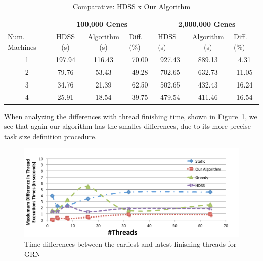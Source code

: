 \documentclass[journal]{IEEEtran}
\begin{document}
\begin{table}[htb]
\centering
\caption{Comparative: HDSS x Our Algorithm}

\begin{tabular}{c|c|c|c|c|c|c|}
\cline{2-7}
\multicolumn{1}{l|}{}                 & \multicolumn{3}{c|}{100,000 Genes}                              & \multicolumn{3}{c|}{2,000,000 Genes}                                                  \\ \hline
\multicolumn{1}{|l|}{Num. Machines} & HDSS (s) & Algorithm (s) & \multicolumn{1}{l|}{Diff. (\%)} & \multicolumn{1}{l|}{HDSS (s)} & Algorithm (s) & \multicolumn{1}{l|}{Diff. (\%)} \\ \hline
\multicolumn{1}{|c|}{1 }       &197.94     & 116.43              & 70.00                         & 927.43                         & 889.13              &           4.31                 \\ \hline
\multicolumn{1}{|c|}{2 }      & 79.76     & 53.43              & 49.28                            & 702.65                          & 632.73              & 11.05                           \\ \hline
\multicolumn{1}{|c|}{3 }      & 34.76     & 21.39              & 62.50                            & 502.65                          & 432.43             &               16.24                  \\ \hline
\multicolumn{1}{|c|}{4 }      & 25.91     & 18.54              & 39.75                            & 479.54                          & 411.46             &               16.54  \\ \hline
\end{tabular}
\label{table: gene}
\end{table}

When analyzing the differences with thread finishing time, shown in
Figure~\ref{fig:GeneDiferenca}, we see that again our algorithm has the smalles
differences, due to its more precise task size definition procedure.

\begin{figure}[htb]
	\begin{center}
	\centering
			\includegraphics[scale=0.345]{MaximoDiferenca_fabrizio_novo.pdf}
	\caption{Time differences between the earliest and latest finishing threads for GRN}
	\label{fig:GeneDiferenca}
	\end{center}
\end{figure}
\end{document}
